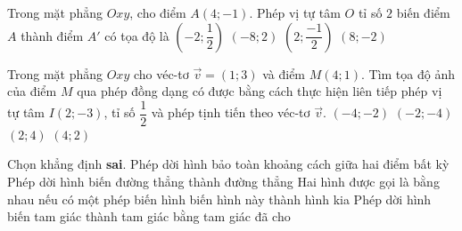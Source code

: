 \begin{ex}%
Trong mặt phẳng $ Oxy $, cho điểm $ A(4; -1) $. Phép vị tự tâm $ O $ tỉ số $ 2 $ biến điểm $ A $ thành điểm $ A' $ có tọa độ  là
\choice
{$ \left(-2; \dfrac{1}{2}\right) $}
{$ \left(-8; 2\right) $}
{$ \left(2; \dfrac{-1}{2}\right) $}
{\True $ \left(8; -2\right) $}
\end{ex}


\begin{ex}%
Trong mặt phẳng $ Oxy $ cho véc-tơ $ \vec{v}=(1; 3) $ và điểm $ M(4; 1) $. Tìm tọa độ ảnh của điểm $ M $ qua phép đồng dạng có được bằng cách thực hiện liên tiếp phép vị tự tâm $ I(2; -3) $, tỉ số $ \dfrac{1}{2} $ và phép tịnh tiến theo véc-tơ $ \vec{v} $.
\choice
{$ (-4; -2) $}
{$ (-2; -4) $}
{$ (2; 4) $}
{\True $ (4; 2) $}
\end{ex}

\begin{ex}%
Chọn khẳng định {\bf sai}.
\choice
{Phép dời hình bảo toàn khoảng cách giữa hai điểm bất kỳ}
{Phép dời hình biến đường thẳng thành đường thẳng}
{\True Hai hình được gọi là bằng nhau nếu có một phép biến hình biến hình này thành hình kia}
{Phép dời hình biến tam giác thành tam giác bằng tam giác đã cho}
\end{ex}

